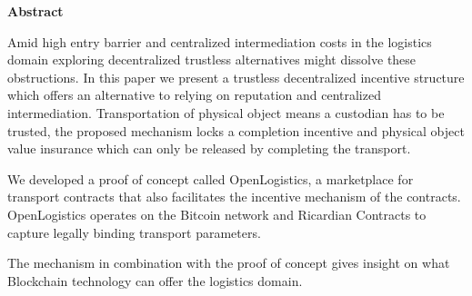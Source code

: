 \thispagestyle{plain}
\begin{center}
    \vspace{0.9cm}
    \textbf{Abstract}
\end{center}

Amid high entry barrier and centralized intermediation costs in the logistics domain exploring decentralized trustless alternatives might dissolve these obstructions. In this paper we present a trustless decentralized incentive structure which offers an alternative to relying on reputation and centralized intermediation. Transportation of physical object means a custodian has to be trusted, the proposed mechanism locks a completion incentive and physical object value insurance which can only be released by completing the transport. \par
We developed a proof of concept called OpenLogistics, a marketplace for transport contracts that also facilitates the incentive mechanism of the contracts. OpenLogistics operates on the Bitcoin network and Ricardian Contracts to capture legally binding transport parameters. \par
The mechanism in combination with the proof of concept gives insight on what  Blockchain technology can offer the logistics domain.


%
%
%
%
%
%

